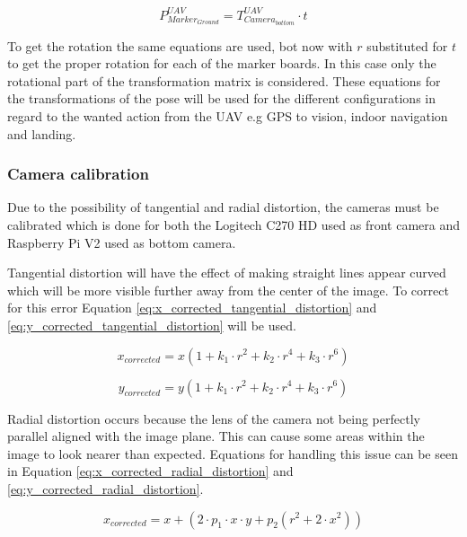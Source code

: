 \documentclass[../Head/report.tex]{subfiles}
\begin{document}
\begin{equation}
	P^{UAV}_{Marker_{Ground}} = T^{UAV}_{Camera_{bottom}} \cdot t 
	\label{eq:translation_drone2ground}  
\end{equation}

To get the rotation the same equations are used, bot now with $r$ substituted for $t$ to get the proper rotation for each of the marker boards. In this case only the rotational part of the transformation matrix is considered. These equations for the transformations of the pose will be used for the different configurations in regard to the wanted action from the UAV e.g GPS to vision, indoor navigation and landing.    

\subsubsection{Camera calibration}
Due to the possibility of tangential and radial distortion, the cameras must be calibrated which is done for both the Logitech C270 HD used as front camera and Raspberry Pi V2 used as bottom camera. 

Tangential distortion will have the effect of making straight lines appear curved which will be more visible further away from the center of the image. To correct for this error Equation \ref{eq:x_corrected_tangential_distortion} and \ref{eq:y_corrected_tangential_distortion} will be used.  

\begin{equation}
	x_{corrected} = x(1+k_1 \cdot r^2 + k_2 \cdot r^4 + k_3 \cdot r^6)
	\label{eq:x_corrected_tangential_distortion}
\end{equation}

\begin{equation}
	y_{corrected} = y(1+k_1 \cdot r^2 + k_2 \cdot r^4 + k_3 \cdot r^6)
	\label{eq:y_corrected_tangential_distortion}
\end{equation}

Radial distortion occurs because the lens of the camera not being perfectly parallel aligned with the image plane. This can cause some areas within the image to look nearer than expected. Equations for handling this issue can be seen in Equation \ref{eq:x_corrected_radial_distortion} and \ref{eq:y_corrected_radial_distortion}. 

\begin{equation}
	x_{corrected} = x + (2 \cdot p_1 \cdot x \cdot y + p_2(r^2 + 2 \cdot x^2))
	\label{eq:x_corrected_radial_distortion}
\end{equation}
\end{document}
